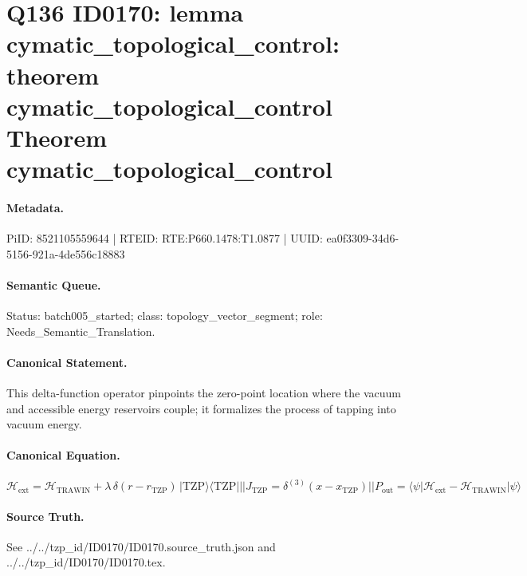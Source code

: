 \section*{Q136 ID0170: lemma cymatic\_topological\_control: theorem cymatic\_topological\_control Theorem cymatic\_topological\_control}
\paragraph{Metadata.}
PiID: 8521105559644 | RTEID: RTE:P660.1478:T1.0877 | UUID: ea0f3309-34d6-5156-921a-4de556c18883

\paragraph{Semantic Queue.}
Status: batch005\_started; class: topology\_vector\_segment; role: Needs\_Semantic\_Translation.

\paragraph{Canonical Statement.}
This delta-function operator pinpoints the zero-point location where the vacuum and accessible energy reservoirs couple; it formalizes the process of tapping into vacuum energy.

\paragraph{Canonical Equation.}
\[
\mathcal{H}_{\mathrm{ext}} = \mathcal{H}_{\mathrm{TRAWIN}}+\lambda\,\delta(r-r_{\mathrm{TZP}})\,\vert \mathrm{TZP}\rangle\langle \mathrm{TZP}\vert || J_{\mathrm{TZP}}=\delta^{(3)}(x-x_{\mathrm{TZP}}) || P_{\mathrm{out}} = \langle\psi\vert \mathcal{H}_{\mathrm{ext}}-\mathcal{H}_{\mathrm{TRAWIN}}\vert\psi\rangle
\]

\paragraph{Source Truth.}
See ../../tzp\_id/ID0170/ID0170.source\_truth.json and ../../tzp\_id/ID0170/ID0170.tex.
